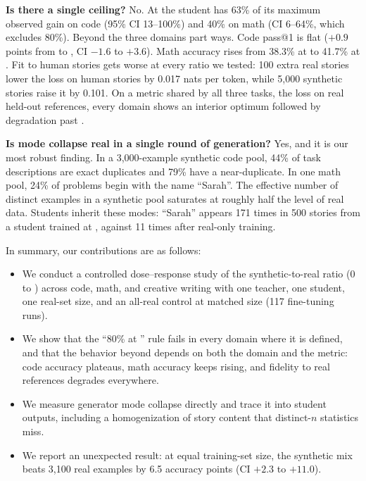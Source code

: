 {\bf Is there a single ceiling?} No.
At  the student has 63\% of its maximum observed gain on code (95\% CI 13--100\%) and 40\% on math (CI 6--64\%, which excludes 80\%).
Beyond  the three domains part ways.
Code pass@1 is flat ($+0.9$ points from  to , CI $-1.6$ to $+3.6$).
Math accuracy rises from 38.3\% at  to 41.7\% at .
Fit to human stories gets worse at every ratio we tested: 100 extra real stories lower the loss on human stories by 0.017 nats per token, while 5,000 synthetic stories raise it by 0.101.
On a metric shared by all three tasks, the loss on real held-out references, every domain shows an interior optimum followed by degradation past .

{\bf Is mode collapse real in a single round of generation?} Yes, and it is our most robust finding.
In a 3,000-example synthetic code pool, 44\% of task descriptions are exact duplicates and 79\% have a near-duplicate.
In one math pool, 24\% of problems begin with the name ``Sarah''.
The effective number of distinct examples in a synthetic pool saturates at roughly half the level of real data.
Students inherit these modes: ``Sarah'' appears 171 times in 500 stories from a student trained at , against 11 times after real-only training.

In summary, our contributions are as follows:
\begin{itemize}[leftmargin=*,itemsep=0pt,topsep=0pt]
    \item We conduct a controlled dose--response study of the synthetic-to-real ratio (0 to ) across code, math, and creative writing with one teacher, one student, one real-set size, and an all-real control at matched size (117 fine-tuning runs).
    \item We show that the ``80\% at '' rule fails in every domain where it is defined, and that the behavior beyond  depends on both the domain and the metric: code accuracy plateaus, math accuracy keeps rising, and fidelity to real references degrades everywhere.
    \item We measure generator mode collapse directly and trace it into student outputs, including a homogenization of story content that distinct-$n$ statistics miss.
    \item We report an unexpected result: at equal training-set size, the  synthetic mix beats 3,100 real \gsm examples by 6.5 accuracy points (CI $+2.3$ to $+11.0$).
\end{itemize}

